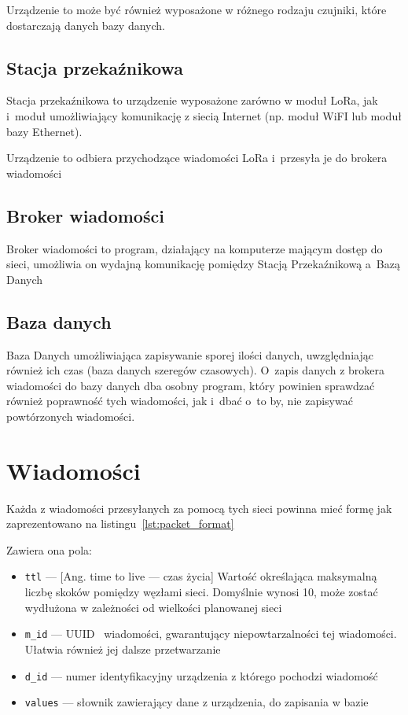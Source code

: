 Urządzenie to może być również wyposażone w różnego rodzaju czujniki, które dostarczają danych bazy danych.

\subsection{Stacja przekaźnikowa}
Stacja przekaźnikowa to urządzenie wyposażone zarówno w moduł LoRa, jak i~moduł umożliwiający komunikację z siecią Internet (np. moduł WiFI lub moduł bazy Ethernet).

Urządzenie to odbiera przychodzące wiadomości LoRa i~przesyła je do brokera wiadomości

\subsection{Broker wiadomości}
Broker wiadomości to program, działający na komputerze mającym dostęp do sieci, umożliwia on wydajną komunikację pomiędzy Stacją Przekaźnikową a~Bazą Danych

\subsection{Baza danych}
Baza Danych umożliwiająca zapisywanie sporej ilości danych, uwzględniając również ich czas (baza danych szeregów czasowych).
O~zapis danych z brokera wiadomości do bazy danych dba osobny program, który powinien sprawdzać również poprawność tych wiadomości, jak i~dbać o~to by, nie zapisywać powtórzonych wiadomości.

\section{Wiadomości}
Każda z wiadomości przesyłanych za pomocą tych sieci powinna mieć formę jak zaprezentowano na listingu~\ref{lst:packet_format}

Zawiera ona pola:
\begin{itemize}
    \item \texttt{ttl} — [Ang. time to live — czas życia] Wartość określająca maksymalną liczbę skoków pomiędzy węzłami sieci. Domyślnie wynosi 10, może zostać wydłużona w zależności od wielkości planowanej sieci
    \item \texttt{m\_id} — UUID~\cite{RFC:uuid} wiadomości, gwarantujący niepowtarzalności tej wiadomości. Ułatwia również jej dalsze przetwarzanie
    \item \texttt{d\_id} — numer identyfikacyjny urządzenia z którego pochodzi wiadomość
    \item \texttt{values} — słownik zawierający dane z urządzenia, do zapisania w bazie
\end{itemize}

